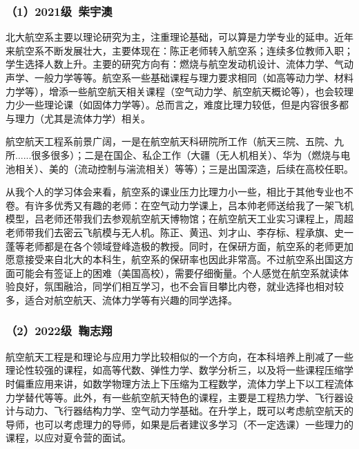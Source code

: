 \documentclass[11pt,oneside]{book}
\begin{document}
\subsubsection{（1）2021级\ 柴宇澳}

北大航空系主要以理论研究为主，注重理论基础，可以算是力学专业的延申。近年来航空系不断发展壮大，主要体现在：陈正老师转入航空系；连续多位教师入职；学生选择人数上升。主要的研究方向有：燃烧与航空发动机设计、流体力学、气动声学、一般力学等等。航空系一些基础课程与理力要求相同（如高等动力学、材料力学等），增添一些航空航天相关课程（空气动力学、航空航天概论等），也会较理力少一些理论课（如固体力学等）。总而言之，难度比理力较低，但是内容很多都与理力（尤其是流体力学）相关。

\vspace{10pt}

航空航天工程系前景广阔，一是在航空航天科研院所工作（航天三院、五院、九所......很多很多）；二是在国企、私企工作（大疆（无人机相关）、华为（燃烧与电池相关）、美的（流动控制与湍流相关）等等）；三是出国深造，后续在高校任职。

\vspace{10pt}

从我个人的学习体会来看，航空系的课业压力比理力小一些，相比于其他专业也不卷。有许多优秀又有趣的老师：在空气动力学课上，吕本帅老师送给我了一架飞机模型，吕老师还带我们去参观航空航天博物馆；在航空航天工业实习课程上，周超老师带我们去密云飞航模与无人机。陈正、黄迅、刘才山、李存标、程承旗、史一蓬等老师都是在各个领域登峰造极的教授。同时，在保研方面，航空系的老师更加愿意接受来自北大的本科生，航空系的保研率也因此非常高。不过航空系出国这方面可能会有签证上的困难（美国高校），需要仔细衡量。个人感觉在航空系就读体验良好，氛围融洽，同学们相互学习，也不会盲目攀比内卷，就业选择也相对较多，适合对航空航天、流体力学等有兴趣的同学选择。

\subsubsection{（2）2022级\ 鞠志翔}

航空航天工程是和理论与应用力学比较相似的一个方向，在本科培养上削减了一些理论性较强的课程，如高等代数、弹性力学、数学分析三，以及将一些课程压缩学时偏重应用来讲，如数学物理方法上下压缩为工程数学，流体力学上下以工程流体力学替代等等。此外，有一些航空航天特色的课程，主要是工程热力学、飞行器设计与动力、飞行器结构力学、空气动力学基础。在升学上，既可以考虑航空航天的导师，也可以考虑理力的导师，如果是后者建议多学习（不一定选课）一些理力的课程，以应对夏令营的面试。

\vspace{10pt}
\end{document}

